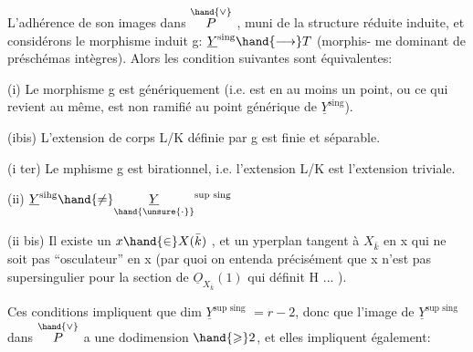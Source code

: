 
L'adhérence de son images dans $\overset{\hand{\vee}}{P}$ , muni de la structure réduite
induite, et considérons le morphisme induit g: $\underline{Y}^{\text{sing}} \hand{\longrightarrow} T$  (morphis-%
me dominant de préschémas  intègres). Alors les condition
 suivantes sont équivalentes:

(i) Le morphisme g est génériquement   (i.e. est   en au moins un point, ou ce qui revient au même, est  non ramifié
au point générique de $\underline{Y}^{\text{sing}}$).

(ibis) L'extension de corps L/K définie par g est finie et
séparable.

(i ter) Le mphisme g est birationnel, i.e. l'extension L/K est
l'extension triviale.

(ii) $\underline{Y}^{\text{sihg}} \hand{\neq} \underset{\hand{\unsure{\cdot}}}{\underline{Y}}^{\text{sup sing}}$ 

(ii bis) Il existe un $x \hand{\in} X(\bar{k})$ , et un yperplan tangent  à $X_{\bar{k}}$
en x qui ne soit pas ``osculateur'' en x (par quoi on entenda précisément
que x n'est pas supersingulier pour la section de $\underline{O}_{X_{\bar{k}}}(1)$ qui définit
H ... ).

Ces conditions impliquent que  dim $\underline{Y}^{\text{sup sing}}$ \deleted{$\leq$}$= r-2$, donc que
l'image de $\underline{Y}^{\text{sup sing}}$ dans $\overset{\hand{\vee}}{P}$ a une dodimension $\hand{\geqslant} 2$, et  elles impliquent
également:


